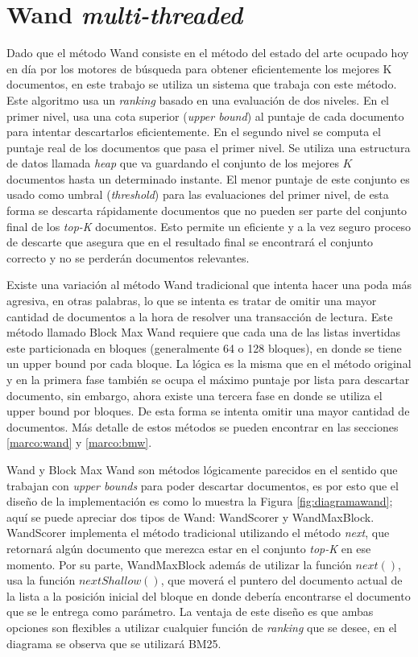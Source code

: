 \chapter{Wand \textit{multi-threaded}}
\label{cap:wand}
Dado que el método Wand \citep{Broder:2003} consiste en el método del estado del arte ocupado hoy en día por los motores de búsqueda para obtener eficientemente los mejores K documentos, en este trabajo se utiliza un sistema que trabaja con este método. Este algoritmo usa un \textit{ranking} basado en una evaluación de dos niveles. En el primer nivel, usa una cota superior (\textit{upper bound}) al puntaje de cada documento para intentar descartarlos eficientemente. En el segundo nivel se computa el puntaje real de los documentos que pasa el primer nivel. Se utiliza una estructura de datos llamada \textit{heap} que va guardando el conjunto de los mejores $K$ documentos hasta un determinado instante. El menor puntaje de este conjunto es usado como umbral (\textit{threshold}) para las evaluaciones del primer nivel, de esta forma se descarta rápidamente documentos que no pueden ser parte del conjunto final de los \textit{top-K} documentos. Esto permite un eficiente y a la vez seguro proceso de descarte que asegura que en el resultado final se encontrará el conjunto correcto y no se perderán documentos relevantes.

Existe una variación al método Wand tradicional que intenta hacer una poda más agresiva, en otras palabras, lo que se intenta es tratar de omitir una mayor cantidad de documentos a la hora de resolver una transacción de lectura. Este método llamado Block Max Wand requiere que cada una de las listas invertidas este particionada en bloques (generalmente 64 o 128 bloques), en donde se tiene un upper bound por cada bloque. La lógica es la misma que en el método original y en la primera fase también se ocupa el máximo puntaje por lista para descartar documento, sin embargo, ahora existe una tercera fase en donde se utiliza el upper bound por bloques. De esta forma se intenta omitir una mayor cantidad de documentos. Más detalle de estos métodos se pueden encontrar en las secciones \ref{marco:wand} y \ref{marco:bmw}.

Wand y Block Max Wand son métodos lógicamente parecidos en el sentido que trabajan con \textit{upper bounds} para poder descartar documentos, es por esto que el diseño de la implementación es como lo muestra la Figura \ref{fig:diagramawand}; aquí se puede apreciar dos tipos de Wand: WandScorer y WandMaxBlock. WandScorer implementa el método tradicional utilizando el método \textit{next}, que retornará algún documento que merezca estar en el conjunto \textit{top-K} en ese momento. Por su parte, WandMaxBlock además de utilizar la función \textit{$next()$}, usa la función \textit{$nextShallow()$}, que moverá el puntero del documento actual de la lista a la posición inicial del bloque en donde debería encontrarse el documento que se le entrega como parámetro. 
La ventaja de este diseño es que ambas opciones son flexibles a utilizar cualquier función de \textit{ranking} que se desee, en el diagrama se observa que se utilizará BM25.

